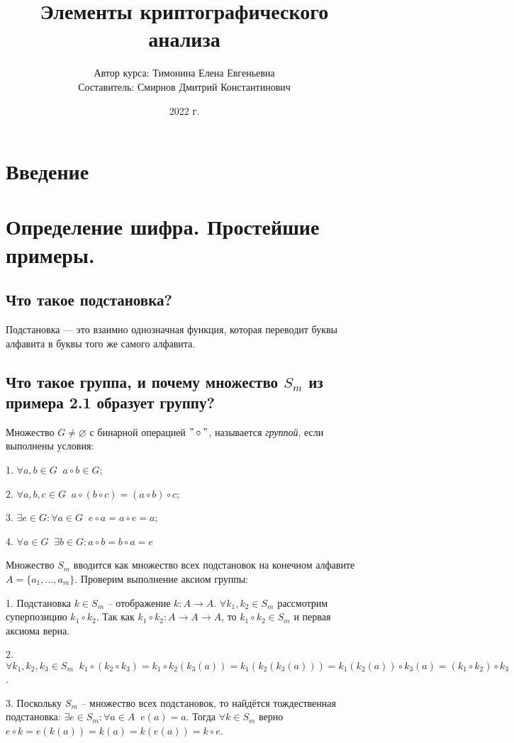 \documentclass[letterpaper,11pt,openany]{book}
\title{Элементы криптографического анализа}
\author{Автор курса: Тимонина Елена Евгеньевна \\ 
		Составитель: Смирнов Дмитрий Константинович }
\date{2022 г.}
\begin{document}
\maketitle
\tableofcontents

\mainmatter
\chapter{Введение}

\chapter{Определение шифра. Простейшие примеры.}
\section{Что такое подстановка?}
Подстановка — это взаимно однозначная функция, которая переводит буквы алфавита в буквы того же самого алфавита.

\section{Что такое группа, и почему множество $S_m$ из примера 2.1 образует группу?}
Множество $G \ne \varnothing$ с бинарной операцией $"\circ"$, называется \emph{группой}, если выполнены условия:

1. $ \forall a,b \in G \;\; a \circ b \in G; $

2. $ \forall a,b,c \in G \;\; a \circ (b \circ c) = (a \circ b) \circ c; $

3. $ \exists e \in G \colon \forall a \in G \;\; e \circ a = a \circ e = a;$

4. $ \forall a \in G \;\; \exists b \in G \colon a \circ b = b \circ a = e$

Множество $S_m$ вводится как множество всех подстановок на конечном алфавите $A = \{a_1, ... , a_m\} $. Проверим выполнение аксиом группы:

1. Подстановка $k \in S_m$ -- отображение $k \colon A \to A$. $\forall k_1, k_2 \in S_m $ рассмотрим суперпозицию $k_1 \circ k_2$. Так как $k_1 \circ k_2 \colon A \to A \to A$, то $k_1 \circ k_2 \in S_m $ и первая аксиома верна.

2. $\forall k_1, k_2, k_3 \in S_m \;\; k_1 \circ (k_2 \circ k_3) = k_1 \circ k_2 ( k_3 (a)) = k_1 ( k_2 ( k_3 (a))) = k_1 ( k_2 (a)) \circ k_3 (a) = (k_1 \circ k_2) \circ k_3$.

3. Поскольку $S_m$ -- множество всех подстановок, то найдётся тождественная подстановка: $\exists e \in S_m \colon \forall a \in A \;\; e(a) = a$. Тогда $\forall k \in S_m $ верно $e \circ k = e(k(a)) = k(a) = k(e(a)) = k \circ e$.
\end{document}

